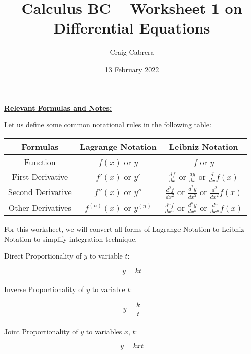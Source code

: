 \documentclass[10pt,letterpaper]{report}
\title{Calculus BC -- Worksheet 1 on Differential Equations}
\author{Craig Cabrera}
\date{13 February 2022}
\begin{document}
\maketitle
\begin{center}
  \textbf{\underline{Relevant Formulas and Notes:}}
\end{center}
Let us define some common notational rules in the following table:
\begin{center}
  \begin{tabular}{|  c | c | c |}
    \hline
    Formulas & Lagrange Notation & Leibniz Notation \\
    \hline
    Function & $f(x)$ or $y$ & $f$ or $y$ \\
    \hline
    First Derivative & $f'(x)$ or $y'$ & $\frac{df}{dx}$ or $\frac{dy}{dx}$ or $\frac{d}{dx}f(x)$ \\
    \hline
    Second Derivative & $f''(x)$ or $y''$ & $\frac{d^{2}f}{dx^{2}}$ or $\frac{d^{2}y}{dx^{2}}$ or $\frac{d^{2}}{dx^{2}}f(x)$ \\
    \hline
    Other Derivatives & $f^{(n)}(x)$ or $y^{(n)}$ & $\frac{d^{n}f}{dx^{n}}$ or $\frac{d^{n}y}{dx^{n}}$ or $\frac{d^{n}}{dx^{n}}f(x)$ \\
    \hline

  \end{tabular}
\end{center}

\noindent For this worksheet, we will convert all forms of Lagrange Notation to Leibniz Notation to simplify integration technique. 

Direct Proportionality of $y$ to variable $t$: 

$$ y=kt $$ \\

Inverse Proportionality of $y$ to variable $t$:

$$ y=\frac{k}{t} $$ \\

Joint Proportionality of $y$ to variables $x$, $t$:

$$ y=kxt $$ \\
\pagebreak 
\end{document}

